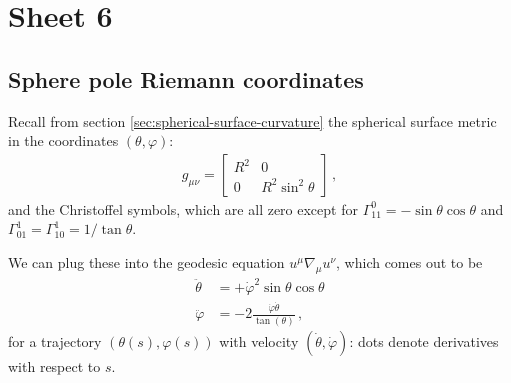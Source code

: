 \documentclass[main.tex]{subfiles}
\begin{document}
\section{Sheet 6}

\subsection{Sphere pole Riemann coordinates}

Recall from section \ref{sec:spherical-surface-curvature} the spherical surface metric in the coordinates \((\theta,  \varphi )\): 
%
\begin{subequations}
\begin{align}
  g_{\mu \nu } = \left[\begin{array}{cc}
  R^2 & 0 \\ 
  0 & R^2 \sin^2 \theta 
  \end{array}\right]
\,,
\end{align}
\end{subequations}
%
and the Christoffel symbols, which are all zero except for \(\Gamma^{0}_{11}= - \sin \theta \cos \theta \) and \(\Gamma^{1}_{01} = \Gamma^{1}_{10} = 1/ \tan \theta \).

We can plug these into the geodesic equation \(u^{\mu } \nabla_{\mu } u^{\nu }\), which comes out to be 
%
\begin{subequations}
\begin{align}
  \ddot{\theta } &= + \dot{\varphi }^2 \sin \theta \cos \theta  \\
  \ddot{\varphi } &= - 2 \frac{\dot{\varphi } \dot{\theta } }{\tan(\theta )} 
\,,
\end{align}
\end{subequations}
%
for a trajectory \((\theta (s), \varphi (s))\) with velocity \((\dot{\theta }, \dot{\varphi })\): dots denote derivatives with respect to \(s\).
\end{document}
